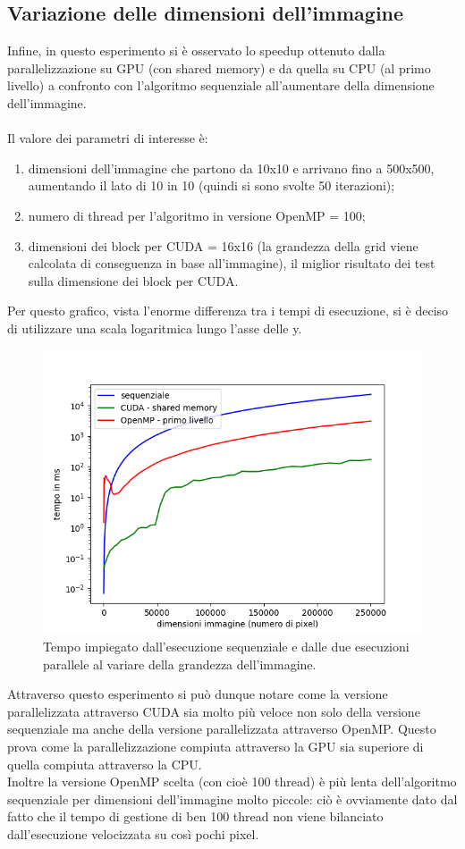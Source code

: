 \documentclass[10pt,twocolumn,letterpaper]{article}
\begin{document}
\subsection{Variazione delle dimensioni dell'immagine}
Infine, in questo esperimento si è osservato lo speedup ottenuto dalla parallelizzazione su GPU (con shared memory) e da quella su CPU (al primo livello) a confronto con l’algoritmo sequenziale all’aumentare della dimensione dell’immagine.\\
\\
Il valore dei parametri di interesse è:
\begin{enumerate}[-]
\item{dimensioni dell'immagine che partono da 10x10 e arrivano fino a 500x500, aumentando il lato di 10 in 10 (quindi si sono svolte 50 iterazioni);}
\item{numero di thread per l'algoritmo in versione OpenMP = 100;}
\item{dimensioni dei block per CUDA = 16x16 (la grandezza della grid viene calcolata di conseguenza in base all'immagine), il miglior risultato dei test sulla dimensione dei block per CUDA.}
\end{enumerate}
Per questo grafico, vista l'enorme differenza tra i tempi di esecuzione, si è deciso di utilizzare una scala logaritmica lungo l'asse delle y.
\begin{figure}[H]
\includegraphics[width=1\linewidth]{test/dimTest/result.png} 
\caption{\small Tempo impiegato dall'esecuzione sequenziale e dalle due esecuzioni parallele al variare della grandezza dell'immagine.}
\label{tfinal}
\end{figure}
Attraverso questo esperimento si può dunque notare come la versione parallelizzata attraverso CUDA sia molto più veloce non solo della versione sequenziale ma anche della versione parallelizzata attraverso OpenMP. Questo prova come la parallelizzazione compiuta attraverso la GPU sia superiore di quella compiuta attraverso la CPU.\\
Inoltre la versione OpenMP scelta (con cioè 100 thread) è più lenta dell'algoritmo sequenziale per dimensioni dell'immagine molto piccole: ciò è ovviamente dato dal fatto che il tempo di gestione di ben 100 thread non viene bilanciato dall'esecuzione velocizzata su così pochi pixel.
\end{document}
